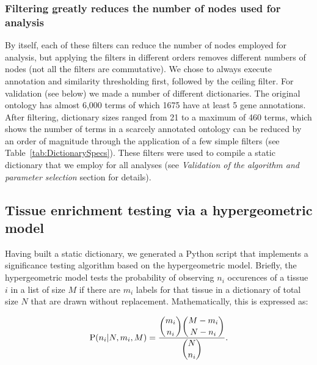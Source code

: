 \documentclass{bmcart}
\begin{document}
\subsubsection*{Filtering greatly reduces the number of nodes used for analysis}
By itself, each of these filters can reduce the number of nodes employed for analysis, but applying the filters in different orders removes different numbers of nodes (not all the filters are commutative). We chose to always execute annotation and similarity thresholding first, followed by the ceiling filter.
For validation (see below) we made a number of different dictionaries. The original ontology has almost 6,000 terms of which 1675 have at least 5 gene annotations. After filtering, dictionary sizes ranged from 21 to a maximum of 460 terms, which shows the number of terms in a scarcely annotated ontology can be reduced by an order of magnitude through the application of a few simple filters (see Table~\ref{tab:DictionarySpecs}). These filters were used to compile a static dictionary that we employ for all analyses (see \emph{Validation of the algorithm and parameter selection} section for details). 

\subsection*{Tissue enrichment testing via a hypergeometric model}
Having built a static dictionary, we generated a Python script that implements a significance testing algorithm based on the hypergeometric model. Briefly, the hypergeometric model tests the probability of observing $n_i$ occurences of a tissue $i$ in a list of size $M$ if there are $m_i$ labels for that tissue in a dictionary of total size $N$ that are drawn without replacement. Mathematically, this is expressed as: 

\begin{eqnarray}\label{hypergeometric}
	\mathrm{P}(n_i | N, m_i, M) = \frac{\dbinom{m_i}{n_i} \dbinom{M-m_i}{N - n_i}}{\dbinom{N}{n_i}}\text{.}
\end{eqnarray}
\end{document}
